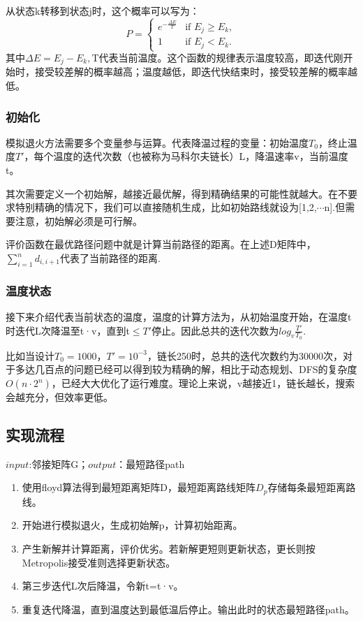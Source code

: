 \documentclass[12pt]{article}
\begin{document}
从状态k转移到状态j时，这个概率可以写为：
\[ P=
\begin{cases}
e^{-\frac{\varDelta E}{T}} & \text{if } E_{j}\ge E_{k},\\ 
1 & \text{if } E_{j}<E_{k}.
\end{cases} \]
其中$\varDelta E=E_{j}-E_{k},$T代表当前温度。这个函数的规律表示温度较高，即迭代刚开始时，接受较差解的概率越高；温度越低，即迭代快结束时，接受较差解的概率越低。
\subsubsection{初始化}
模拟退火方法需要多个变量参与运算。代表降温过程的变量：初始温度$T_{0}$，终止温度$T\prime$，每个温度的迭代次数（也被称为马科尔夫链长）L，降温速率v，当前温度t。

其次需要定义一个初始解，越接近最优解，得到精确结果的可能性就越大。在不要求特别精确的情况下，我们可以直接随机生成，比如初始路线就设为[1,2,$\cdots$n].但需要注意，初始解必须是可行解。

评价函数在最优路径问题中就是计算当前路径的距离。在上述D矩阵中，$\sum_{i=1}^n d_{i,i+1}$代表了当前路径的距离.
\subsubsection{温度状态}
接下来介绍代表当前状态的温度，温度的计算方法为，从初始温度开始，在温度t时迭代L次降温至t·v，直到t$\le T\prime$停止。因此总共的迭代次数为$log_{v}\frac{T\prime}{T_{0}}$. 

比如当设计$T_{0}=1000$，$T\prime=10^{-3}$，链长250时，总共的迭代次数约为30000次，对于多达几百点的问题已经可以得到较为精确的解，相比于动态规划、DFS的复杂度$O(n\cdot 2^{n})$，已经大大优化了运行难度。理论上来说，v越接近1，链长越长，搜索会越充分，但效率更低。
\subsection{实现流程}
$input$:邻接矩阵G；$output$：最短路径path
\begin{enumerate}
	\item 使用floyd算法得到最短距离矩阵D，最短距离路线矩阵$D_{p}$存储每条最短距离路线。
	\item 开始进行模拟退火，生成初始解p，计算初始距离。
	\item 产生新解并计算距离，评价优劣。若新解更短则更新状态，更长则按Metropolis接受准则选择更新状态。
	\item 第三步迭代L次后降温，令新t=t·v。
	\item 重复迭代降温，直到温度达到最低温后停止。输出此时的状态最短路径path。
\end{enumerate}
\end{document}
